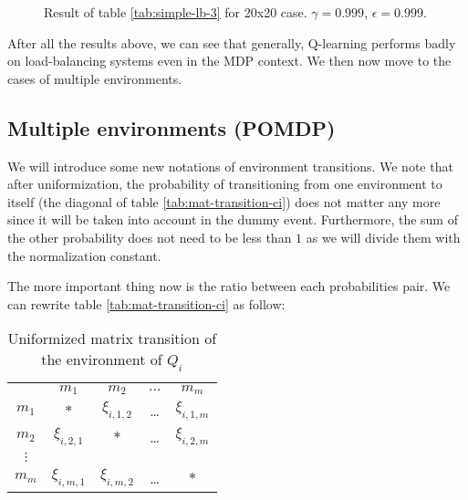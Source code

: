 \documentclass[
  a4paper, xcolor = usenames,dvipsnames]{article}
\theoremstyle{definition}
\theoremstyle{definition}
\theoremstyle{definition}
\theoremstyle{definition}
\theoremstyle{remark}
\begin{document}
\begin{figure}

{\centering {}

}

\caption{Result of table \ref{tab:simple-lb-3} for 20x20 case. \(\gamma = 0.999\), \(\epsilon = 0.999\).}\label{fig:20x20-simple-lb-4}
\end{figure}

After all the results above, we can see that generally, Q-learning performs badly on load-balancing systems even in the MDP context. We then now move to the cases of multiple environments.

\hypertarget{multiple-environments-pomdp}{%
\subsection{Multiple environments (POMDP)}\label{multiple-environments-pomdp}}

We will introduce some new notations of environment transitions. We note that after uniformization, the probability of transitioning from one environment to itself (the diagonal of table \ref{tab:mat-transition-ci}) does not matter any more since it will be taken into account in the dummy event. Furthermore, the sum of the other probability does not need to be less than \(1\) as we will divide them with the normalization constant.

The more important thing now is the ratio between each probabilities pair. We can rewrite table \ref{tab:mat-transition-ci} as follow:

\begin{table}[!htbp]
\caption{Uniformized matrix transition of the environment of $Q_{i}$}
\begin{center}
\begin{tabular}{c c c c c}
    \hline
    & $m_{1}$ & $m_{2}$ & $\dots$ & $m_{m}$ \\
    $m_{1}$ & $*$ & $\xi_{i, 1, 2}$ & \dots & $\xi_{i, 1, m}$ \\
    $m_{2}$ & $\xi_{i, 2, 1}$ & $*$ & \dots & $\xi_{i, 2, m}$ \\
    $\vdots$ & & & & \\
    $m_{m}$ & $\xi_{i, m, 1}$ & $\xi_{i, m, 2}$ & \dots & $*$ \\
    \hline
\end{tabular}
\end{center}
\label{tab:uni-mat-transition-ci}
\end{table}
\end{document}
